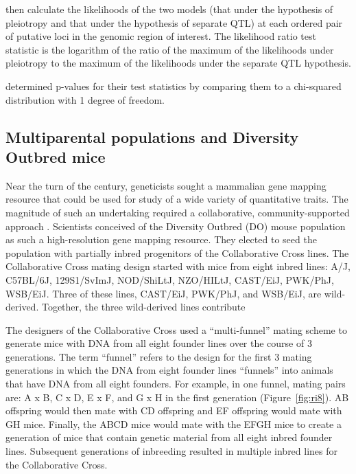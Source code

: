 \documentclass[oneside]{book}\usepackage[]{graphicx}\usepackage[]{color}
\begin{document}
\citet{jiang1995multiple} then calculate the likelihoods of the two models
(that under the hypothesis of pleiotropy and that under the hypothesis of separate QTL)
at each ordered pair of putative loci in the genomic region of interest.
The likelihood ratio test statistic is the logarithm of the ratio of the maximum
of the likelihoods under pleiotropy to the maximum of the likelihoods under
the separate QTL hypothesis. 

\citet{jiang1995multiple} determined p-values for their test statistics by comparing
them to a chi-squared distribution with 1 degree of freedom. 





\subsection{Multiparental populations and Diversity Outbred mice}

Near the turn of the century, geneticists sought a mammalian gene mapping resource 
that could be used for study of a wide variety of quantitative traits. 
The magnitude of such an undertaking required a collaborative, community-supported
approach \citep{de2014genetics}. Scientists conceived of the Diversity Outbred (DO)
mouse population as such a high-resolution gene mapping resource.
They elected to seed the population with partially inbred progenitors of the
Collaborative Cross lines. The Collaborative Cross mating design started with
mice from eight inbred lines: A/J, C57BL/6J, 129S1/SvImJ,
NOD/ShiLtJ, NZO/HILtJ, CAST/EiJ, PWK/PhJ, WSB/EiJ. Three of these lines, CAST/EiJ, PWK/PhJ, and WSB/EiJ, are wild-derived. Together, the three wild-derived lines contribute 

The designers of the Collaborative Cross used a ``multi-funnel'' mating scheme to generate
mice with DNA from all eight founder lines over the course of 3 generations.
The term ``funnel'' refers to the design for the first 3 mating generations in which the
DNA from eight founder lines ``funnels'' into animals that have DNA from all eight founders.
For example, in one funnel, mating pairs are: A x B, C x D, E x F, and G x H in the first generation (Figure~\ref{fig:ri8}).
AB offspring would then mate with CD offspring and EF offspring would mate with GH mice.
Finally, the ABCD mice would mate with the EFGH mice to create a generation of mice that
contain genetic material from all eight inbred founder lines.
Subsequent generations of inbreeding resulted in multiple inbred lines for the Collaborative Cross.
\end{document}
